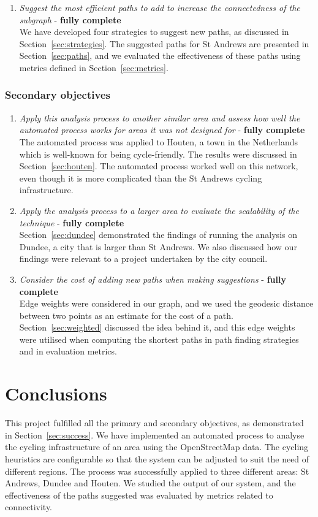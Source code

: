 \documentclass[12pt,a4paper]{report}
\begin{document}
\begin{enumerate}
    \item \textit{Suggest the most efficient paths to add to increase the connectedness of the subgraph} - \textbf{fully complete}\\[1mm]
    We have developed four strategies to suggest new paths, as discussed in Section~\ref{sec:strategies}. The suggested paths for St Andrews are presented in Section~\ref{sec:paths}, and we evaluated the effectiveness of these paths using metrics defined in Section~\ref{sec:metrics}.
\end{enumerate}

\subsection{Secondary objectives}
\begin{enumerate}
    \item \textit{Apply this analysis process to another similar area and assess how well the automated process works for areas it was not designed for} - \textbf{fully complete}\\[1mm]
    The automated process was applied to Houten, a town in the Netherlands which is well-known for being cycle-friendly. The results were discussed in Section~\ref{sec:houten}. The automated process worked well on this network, even though it is more complicated than the St Andrews cycling infrastructure.

    \item \textit{Apply the analysis process to a larger area to evaluate the scalability of the technique} - \textbf{fully complete}\\[1mm]
    Section~\ref{sec:dundee} demonstrated the findings of running the analysis on Dundee, a city that is larger than St Andrews. We also discussed how our findings were relevant to a project undertaken by the city council.

    \item \textit{Consider the cost of adding new paths when making suggestions} - \textbf{fully complete}\\[1mm]
    Edge weights were considered in our graph, and we used the geodesic distance between two points as an estimate for the cost of a path. Section~\ref{sec:weighted} discussed the idea behind it, and this edge weights were utilised when computing the shortest paths in path finding strategies and in evaluation metrics.
\end{enumerate}

\chapter{Conclusions}\label{chapter:concl}
This project fulfilled all the primary and secondary objectives, as demonstrated in Section~\ref{sec:success}. We have implemented an automated process to analyse the cycling infrastructure of an area using the OpenStreetMap data. The cycling heuristics are configurable so that the system can be adjusted to suit the need of different regions. The process was successfully applied to three different areas: St Andrews, Dundee and Houten. We studied the output of our system, and the effectiveness of the paths suggested was evaluated by metrics related to connectivity.
\end{document}
